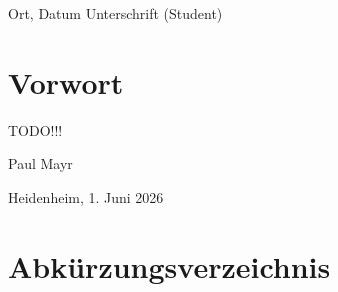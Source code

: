 \documentclass[oneside]{ausarbeitung}
\begin{document}
\vspace{3cm}

\hspace{3cm} Ort, Datum \hspace{3cm} Unterschrift (Student)




	\chapter*{Vorwort}

TODO!!!



\vspace{3cm}

Paul Mayr

\vspace{1cm}

Heidenheim, 1. Juni 2026


\section*{}

\pagebreak

\begin{abstract}
  TODO!!!
\end{abstract}
	
	
	
	\cleardoublepage
	\tableofcontents
	
	
	\listoffigures
	\section*{}
	
	\chapter*{Abkürzungsverzeichnis}
\end{document}
